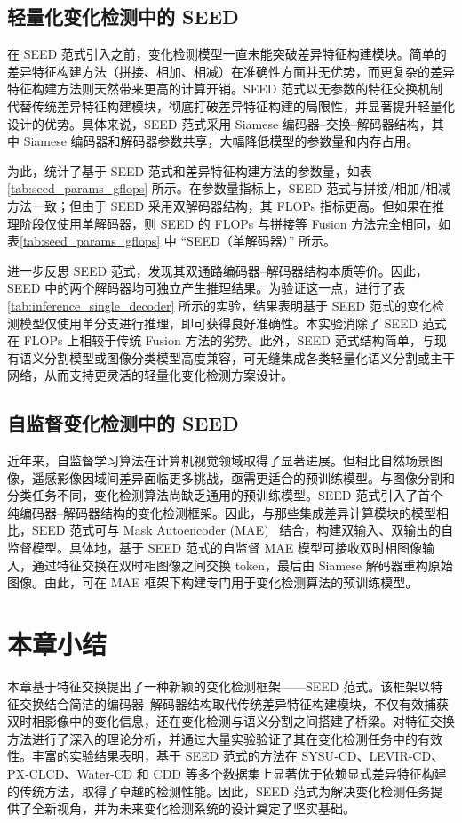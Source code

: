 \subsection{轻量化变化检测中的 SEED}  
在 SEED 范式引入之前，变化检测模型一直未能突破差异特征构建模块。简单的差异特征构建方法（拼接、相加、相减）在准确性方面并无优势，而更复杂的差异特征构建方法则天然带来更高的计算开销。SEED 范式以无参数的特征交换机制代替传统差异特征构建模块，彻底打破差异特征构建的局限性，并显著提升轻量化设计的优势。具体来说，SEED 范式采用 Siamese 编码器–交换–解码器结构，其中 Siamese 编码器和解码器参数共享，大幅降低模型的参数量和内存占用。

为此，统计了基于 SEED 范式和差异特征构建方法的参数量，如表\ref{tab:seed_params_gflops} 所示。在参数量指标上，SEED 范式与拼接/相加/相减方法一致；但由于 SEED 采用双解码器结构，其 FLOPs 指标更高。但如果在推理阶段仅使用单解码器，则 SEED 的 FLOPs 与拼接等 Fusion 方法完全相同，如表\ref{tab:seed_params_gflops} 中 “SEED（单解码器）” 所示。

进一步反思 SEED 范式，发现其双通路编码器–解码器结构本质等价。因此，SEED 中的两个解码器均可独立产生推理结果。为验证这一点，进行了表\ref{tab:inference_single_decoder} 所示的实验，结果表明基于 SEED 范式的变化检测模型仅使用单分支进行推理，即可获得良好准确性。本实验消除了 SEED 范式在 FLOPs 上相较于传统 Fusion 方法的劣势。此外，SEED 范式结构简单，与现有语义分割模型或图像分类模型高度兼容，可无缝集成各类轻量化语义分割或主干网络，从而支持更灵活的轻量化变化检测方案设计。

\subsection{自监督变化检测中的 SEED}  
近年来，自监督学习算法在计算机视觉领域取得了显著进展。但相比自然场景图像，遥感影像因域间差异面临更多挑战，亟需更适合的预训练模型。与图像分割和分类任务不同，变化检测算法尚缺乏通用的预训练模型。SEED 范式引入了首个纯编码器–解码器结构的变化检测框架。因此，与那些集成差异计算模块的模型相比，SEED 范式可与 Mask Autoencoder (MAE)~\cite{he_masked_2021} 结合，构建双输入、双输出的自监督模型。具体地，基于 SEED 范式的自监督 MAE 模型可接收双时相图像输入，通过特征交换在双时相图像之间交换 token，最后由 Siamese 解码器重构原始图像。由此，可在 MAE 框架下构建专门用于变化检测算法的预训练模型。

\section{本章小结}  
本章基于特征交换提出了一种新颖的变化检测框架——SEED 范式。该框架以特征交换结合简洁的编码器–解码器结构取代传统差异特征构建模块，不仅有效捕获双时相影像中的变化信息，还在变化检测与语义分割之间搭建了桥梁。对特征交换方法进行了深入的理论分析，并通过大量实验验证了其在变化检测任务中的有效性。丰富的实验结果表明，基于 SEED 范式的方法在 SYSU‐CD、LEVIR‐CD、PX‐CLCD、Water‐CD 和 CDD 等多个数据集上显著优于依赖显式差异特征构建的传统方法，取得了卓越的检测性能。因此，SEED 范式为解决变化检测任务提供了全新视角，并为未来变化检测系统的设计奠定了坚实基础。  

